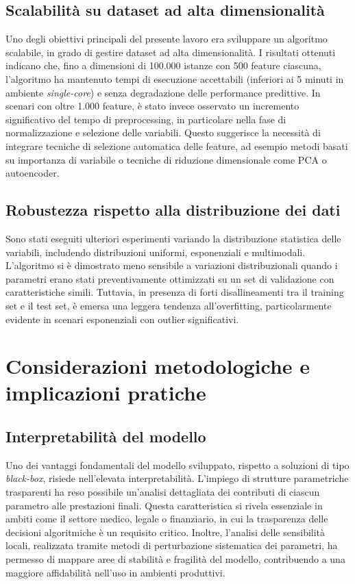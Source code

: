\documentclass[a4paper,12pt]{report}
\theoremstyle{plain}
\begin{document}
\subsection{Scalabilità su dataset ad alta dimensionalità}
Uno degli obiettivi principali del presente lavoro era sviluppare un algoritmo scalabile, in grado di gestire dataset ad alta dimensionalità. I risultati ottenuti indicano che, fino a dimensioni di 100.000 istanze con 500 feature ciascuna, l'algoritmo ha mantenuto tempi di esecuzione accettabili (inferiori ai 5 minuti in ambiente \textit{single-core}) e senza degradazione delle performance predittive.
In scenari con oltre 1.000 feature, è stato invece osservato un incremento significativo del tempo di preprocessing, in particolare nella fase di normalizzazione e selezione delle variabili. Questo suggerisce la necessità di integrare tecniche di selezione automatica delle feature, ad esempio metodi basati su importanza di variabile o tecniche di riduzione dimensionale come PCA o autoencoder.
\subsection{Robustezza rispetto alla distribuzione dei dati}
Sono stati eseguiti ulteriori esperimenti variando la distribuzione statistica delle variabili, includendo distribuzioni uniformi, esponenziali e multimodali. L'algoritmo si è dimostrato meno sensibile a variazioni distribuzionali quando i parametri erano stati preventivamente ottimizzati su un set di validazione con caratteristiche simili. Tuttavia, in presenza di forti disallineamenti tra il training set e il test set, è emersa una leggera tendenza all'overfitting, particolarmente evidente in scenari esponenziali con outlier significativi.
\section{Considerazioni metodologiche e implicazioni pratiche}
\subsection{Interpretabilità del modello}
Uno dei vantaggi fondamentali del modello sviluppato, rispetto a soluzioni di tipo \emph{black-box}, risiede nell'elevata interpretabilità. L'impiego di strutture parametriche trasparenti ha reso possibile un'analisi dettagliata dei contributi di ciascun parametro alle prestazioni finali. Questa caratteristica si rivela essenziale in ambiti come il settore medico, legale o finanziario, in cui la trasparenza delle decisioni algoritmiche è un requisito critico.
Inoltre, l'analisi delle sensibilità locali, realizzata tramite metodi di perturbazione sistematica dei parametri, ha permesso di mappare aree di stabilità e fragilità del modello, contribuendo a una maggiore affidabilità nell'uso in ambienti produttivi.
\end{document}
